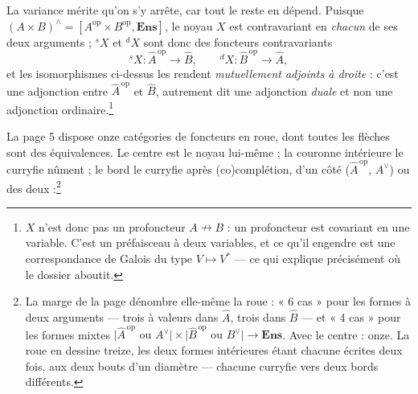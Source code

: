 \documentclass[11pt,a4paper]{article}
\begin{document}
La variance mérite qu'on s'y arrête, car tout le reste en dépend. Puisque
$(A\times B)^{\wedge} = [A^{\mathrm{op}} \times B^{\mathrm{op}},
\mathbf{Ens}]$, le noyau $X$ est contravariant en \emph{chacun} de ses deux
arguments ; ${}^{s}X$ et ${}^{d}X$ sont donc des foncteurs contravariants
\[
{}^{s}X : \widehat{A}^{\,\mathrm{op}} \longrightarrow \widehat{B},
\qquad
{}^{d}X : \widehat{B}^{\,\mathrm{op}} \longrightarrow \widehat{A},
\]
et les isomorphismes ci-dessus les rendent \emph{mutuellement adjoints à
droite} : c'est une adjonction entre $\widehat{A}^{\,\mathrm{op}}$ et
$\widehat{B}$, autrement dit une adjonction \emph{duale} et non une adjonction
ordinaire.\footnote{$X$ n'est donc pas un profoncteur $A \nrightarrow B$ : un
profoncteur est covariant en une variable. C'est un préfaisceau à deux
variables, et ce qu'il engendre est une correspondance de Galois du type
$V \mapsto V^{*}$ — ce qui explique précisément où le dossier aboutit.}

La page 5 dispose onze catégories de foncteurs en roue, dont toutes les
flèches sont des équivalences. Le centre est le noyau lui-même ; la couronne
intérieure le curryfie nûment ; le bord le curryfie après (co)complétion,
d'un côté ($\widehat{A}^{\,\mathrm{op}}$, $A^{\vee}$) ou des
deux :\footnote{La marge de la page dénombre elle-même la roue : « 6 cas »
pour les formes à deux arguments — trois à valeurs dans $\widehat{A}$, trois
dans $\widehat{B}$ — et « 4 cas » pour les formes mixtes
$\bigl|\widehat{A}^{\,\mathrm{op}} \text{ ou } A^{\vee}\bigr| \times
\bigl|\widehat{B}^{\,\mathrm{op}} \text{ ou } B^{\vee}\bigr| \to
\mathbf{Ens}$. Avec le centre : onze. La roue en dessine treize, les deux
formes intérieures étant chacune écrites deux fois, aux deux bouts d'un
diamètre — chacune curryfie vers deux bords différents.}
\end{document}
